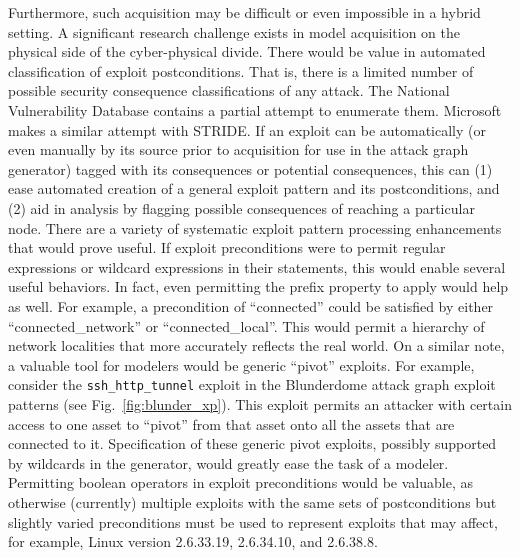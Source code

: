 Furthermore, such acquisition may be difficult or even impossible in a
hybrid setting. A significant research challenge exists in model acquisition on
the physical side of the cyber-physical divide.
There would be value in automated classification of exploit postconditions.
That is, there is a limited number of possible security consequence
classifications of any attack. The National Vulnerability Database contains a
partial attempt to enumerate them. Microsoft makes a similar attempt with
STRIDE. If an exploit can be automatically (or even manually by its source
prior to acquisition for use in the attack graph generator) tagged with its
consequences or potential consequences, this can (1) ease automated creation of
a general exploit pattern and its postconditions, and (2) aid in analysis by
flagging possible consequences of reaching a particular node. 
There are a variety of systematic exploit pattern processing enhancements that
would prove useful.
If exploit preconditions were to permit regular expressions or wildcard
expressions in their statements, this would enable several useful behaviors.
In fact, even permitting the prefix property to apply would help as well. For
example, a precondition of ``connected'' could be satisfied by either
``connected\_network'' or ``connected\_local''. This would permit a hierarchy
of network localities that more accurately reflects the real world.
On a similar note, a valuable tool for modelers would be generic ``pivot''
exploits. For example, consider the \texttt{ssh\_http\_tunnel} exploit in the
Blunderdome attack graph exploit patterns (see Fig.~\ref{fig:blunder_xp}).
This exploit permits an attacker with certain access to one asset to ``pivot''
from that asset onto all the assets that are connected to it. Specification of
these generic pivot exploits, possibly supported by wildcards in the generator,
would greatly ease the task of a modeler.
Permitting boolean operators in exploit preconditions would be valuable, as
otherwise (currently) multiple exploits with the same sets of postconditions but
slightly varied preconditions must be used to represent exploits that may
affect, for example, Linux version 2.6.33.19, 2.6.34.10, and 2.6.38.8.
